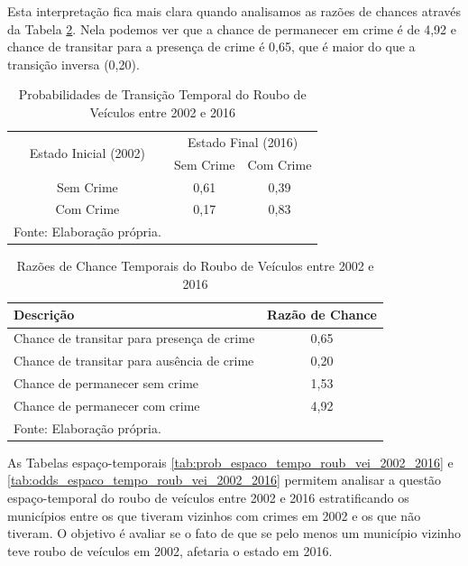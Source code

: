 \documentclass[12pt,openright,oneside,a4paper,english,french,spanish]{abntex2}
\numberwithin{table}{section} %
\numberwithin{figure}{section} %
\begin{document}
Esta interpretação fica mais clara quando analisamos as razões de chances através da Tabela \ref{tab:odds_tempo_roub_vei_2002_2016}. Nela podemos ver que a chance de permanecer em crime é de 4,92 e chance de transitar para a presença de crime é 0,65, que é maior do que a transição inversa (0,20).


\begin{table}[H]
\centering
\caption{Probabilidades de Transição Temporal do Roubo de Veículos entre 2002 e 2016}
        \begin{tabular}{ccc}
            \hline
            \multirow{2}{*}{Estado Inicial (2002)} & \multicolumn{2}{c}{Estado Final (2016)}  \\\cline{2-3} 
                                     & \multicolumn{1}{l}{Sem Crime} & \multicolumn{1}{l}{Com Crime} \\\hline
            {Sem Crime} & {0,61} & {0,39} \\                \hline
            {Com Crime} & {0,17} & {0,83} \\                \hline
            \tiny Fonte: Elaboração própria.
        \end{tabular}
    \label{tab:prob_tempo_roub_vei_2002_2016}
\end{table}

\begin{table}[H]
\centering
\caption{Razões de Chance Temporais do Roubo de Veículos entre 2002 e 2016}
        \begin{tabular}{lc}
            \hline
            {\textbf{Descrição}} & {\textbf{Razão de Chance}} \\\hline
            {Chance de transitar para presença de crime} & {0,65} \\
            {Chance de transitar para ausência de crime} & {0,20} \\
            {Chance de permanecer sem crime} & {1,53} \\
            {Chance de permanecer com crime} & {4,92} \\\hline
            \tiny Fonte: Elaboração própria.
        \end{tabular}
    \label{tab:odds_tempo_roub_vei_2002_2016}
\end{table}



As Tabelas espaço-temporais \ref{tab:prob_espaco_tempo_roub_vei_2002_2016} e \ref{tab:odds_espaco_tempo_roub_vei_2002_2016} permitem analisar a questão espaço-temporal do roubo de veículos entre 2002 e 2016 estratificando os municípios entre os que tiveram vizinhos com crimes em 2002 e os que não tiveram. O objetivo é avaliar se o fato de que se pelo menos um município vizinho teve roubo de veículos em 2002, afetaria o estado em 2016.
\end{document}
